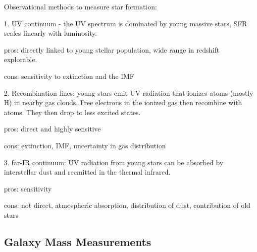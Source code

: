 Observational methods to measure star formation:

1.  UV continuum - the UV spectrum is dominated by young massive stars, SFR scales linearly with luminosity.
	
	pros:  directly linked to young stellar population, wide range in redshift explorable.
	
	cons:  sensitivity to extinction and the IMF
	
2.  Recombination lines:  young stars emit UV radiation that ionizes atoms (mostly H) in nearby gas clouds.  Free electrons in the ionized gas then recombine with atoms.  They then drop to less excited states.  

	pros:  direct and highly sensitive
	
	cons:  extinction, IMF, uncertainty in gas distribution
	
3.  far-IR continuum:  UV radiation from young stars can be absorbed by interstellar dust and reemitted in the thermal infrared.

	pros:  sensitivity
	
	cons:  not direct, atmospheric absorption, distribution of dust, contribution of old stars


\subsection{Galaxy Mass Measurements}

